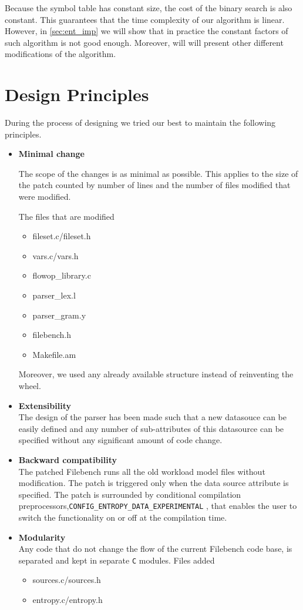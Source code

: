 Because the symbol table has constant size, the cost of the binary search is also constant.
This guarantees that the time complexity of our algorithm is linear. However, in \ref{sec:ent_imp} we will show that in practice the 
constant factors of such algorithm is not good enough. Moreover, will will present other different modifications
of the algorithm.


\section{Design Principles}
During the process of designing we tried our best to maintain the following principles. 

\begin{itemize}

\item \textbf{Minimal change} %

The scope of the changes is as minimal as possible. This applies to the size of the patch counted by number of lines and the number of files modified that were modified. 

The files that are modified
\begin{itemize}
\item fileset.c/fileset.h
\item vars.c/vars.h
\item flowop\_library.c
\item parser\_lex.l
\item parser\_gram.y
\item filebench.h
\item Makefile.am
\end{itemize}
Moreover, we used any already available structure instead of reinventing the wheel.

\item \textbf{Extensibility} \\
The design of the parser has been made such that a new datasouce can be easily defined and any number of sub-attributes of this datasource can be specified without any significant amount of code change.

\item \textbf{Backward compatibility} \\
The patched Filebench runs all the old workload model files without modification. The patch is triggered only when the data source attribute is specified.
 The patch is surrounded by conditional compilation preprocessors,\verb+CONFIG_ENTROPY_DATA_EXPERIMENTAL+ , that enables the user to switch the functionality on or off at the compilation time.

\item \textbf{Modularity}\\
Any code that do not change the flow of the current Filebench code base, is separated and kept in separate \verb+C+ modules.
 Files added
\begin{itemize}
\item sources.c/sources.h 
\item entropy.c/entropy.h
\end{itemize}

\end{itemize}
